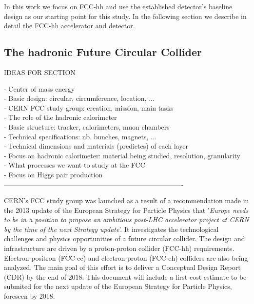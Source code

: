 In this work we focus on FCC-hh and use the established detector's baseline design as our starting point for this study. In the following section we describe in detail the FCC-hh accelerator and detector.

\subsection{The hadronic Future Circular Collider}
\label{section:FCC}

IDEAS FOR SECTION

- Center of mass energy \checkmark \\
- Basic design: circular, circumference, location, ... \checkmark\\
- CERN FCC study group: creation, mission, main tasks \checkmark \\
- The role of the hadronic calorimeter \\
- Basic structure: tracker, calorimeters, muon chambers \checkmark \\
- Technical specifications: nb. bunches, magnets, ... \checkmark\\
- Technical dimensions and materials (predictes) of each layer \checkmark\\
- Focus on hadronic calorimeter: material being studied, resolution, granularity \checkmark\\
- What processes we want to study at the FCC \\
- Focus on Higgs pair production \\

-------------------------------------------------------------------------------

CERN's FCC study group was launched as a result of a recommendation made in the  2013 update of the European Strategy for Particle Physics that '\textit{Europe needs to be in a position to propose an ambitious post-LHC accelerator project at CERN by the time of the next Strategy update}'. It investigates the technological challenges and physics opportunities of a future circular collider. The design and infrastructure are driven by a proton-proton collider (FCC-hh) requirements. Electron-positron (FCC-ee) and electron-proton (FCC-eh) colliders are also being analyzed. The main goal of this effort is to deliver a Conceptual Design Report (CDR) by the end of 2018. This document will include a first cost estimate to be submited for the next update of the European Strategy for Particle Physics, foreseen by 2018.


